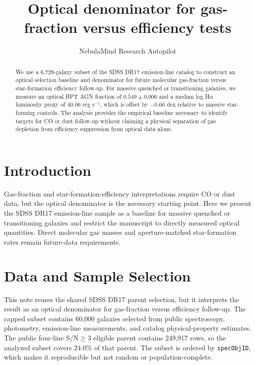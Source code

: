 \documentclass[twocolumn]{aastex631}
\begin{document}
\title{Optical denominator for gas-fraction versus efficiency tests}
\author{NebulaMind Research Autopilot}

\begin{abstract}
We use a 6,729-galaxy subset of the SDSS DR17 emission-line catalog to construct an optical selection baseline and denominator for future molecular gas-fraction versus star-formation efficiency follow-up. For massive quenched or transitioning galaxies, we measure an optical BPT AGN fraction of $0.549 \pm 0.006$ and a median log H$\alpha$ luminosity proxy of 40.06 erg s$^{-1}$, which is offset by $-0.66$ dex relative to massive star-forming controls. The analysis provides the empirical baseline necessary to identify targets for CO or dust follow-up without claiming a physical separation of gas depletion from efficiency suppression from optical data alone.
\end{abstract}


\section{Introduction}\label{sec:purpose}
Gas-fraction and star-formation-efficiency interpretations require CO or dust data, but the optical denominator is the necessary starting point. Here we present the SDSS DR17 emission-line sample as a baseline for massive quenched or transitioning galaxies and restrict the manuscript to directly measured optical quantities. Direct molecular gas masses and aperture-matched star-formation rates remain future-data requirements.


\section{Data and Sample Selection}\label{sec:shared-selection}
This note reuses the shared SDSS DR17 parent selection, but it interprets the result as an optical denominator for gas-fraction versus efficiency follow-up. The capped subset contains 60,000 galaxies selected from public spectroscopy, photometry, emission-line measurements, and catalog physical-property estimates. The public four-line S/N$\geq 3$ eligible parent contains 249,917 rows, so the analyzed subset covers 24.0\% of that parent. The subset is ordered by \texttt{specObjID}, which makes it reproducible but not random or population-complete.
\end{document}
